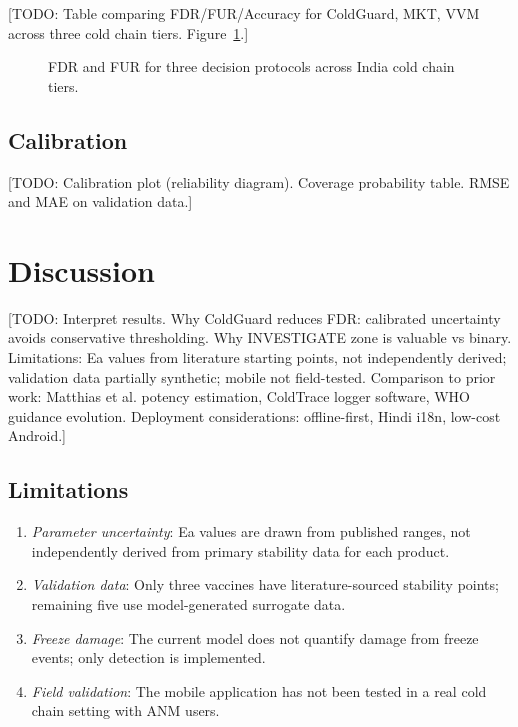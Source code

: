 \documentclass[12pt,a4paper]{article}
\begin{document}
[TODO: Table comparing FDR/FUR/Accuracy for ColdGuard, MKT, VVM across three
cold chain tiers. Figure~\ref{fig:simulation}.]

\begin{figure}[H]
  \centering
  \caption{FDR and FUR for three decision protocols across India cold chain tiers.}
  \label{fig:simulation}
\end{figure}

\subsection{Calibration}

[TODO: Calibration plot (reliability diagram). Coverage probability table.
RMSE and MAE on validation data.]

\section{Discussion}
\label{sec:discussion}

[TODO: Interpret results. Why ColdGuard reduces FDR: calibrated uncertainty
avoids conservative thresholding. Why INVESTIGATE zone is valuable vs binary.
Limitations: Ea values from literature starting points, not independently derived;
validation data partially synthetic; mobile not field-tested. Comparison to
prior work: Matthias et al. potency estimation, ColdTrace logger software,
WHO guidance evolution. Deployment considerations: offline-first, Hindi i18n,
low-cost Android.]

\subsection{Limitations}

\begin{enumerate}
  \item \textit{Parameter uncertainty}: Ea values are drawn from published ranges,
    not independently derived from primary stability data for each product.
  \item \textit{Validation data}: Only three vaccines have literature-sourced
    stability points; remaining five use model-generated surrogate data.
  \item \textit{Freeze damage}: The current model does not quantify damage from
    freeze events; only detection is implemented.
  \item \textit{Field validation}: The mobile application has not been tested
    in a real cold chain setting with ANM users.
\end{enumerate}
\end{document}
